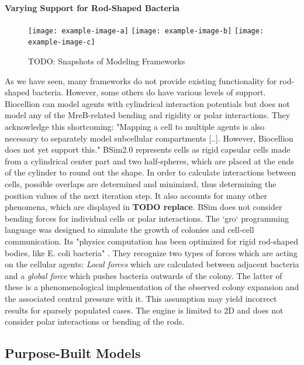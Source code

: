 \documentclass{article}
\begin{document}
\paragraph{Varying Support for Rod-Shaped Bacteria}

\begin{figure}[H]
    \centering
    \texttt{[image: example-image-a]}
    \texttt{[image: example-image-b]}
    \texttt{[image: example-image-c]}
    \caption{TODO: Snapshots of Modeling Frameworks}
\end{figure}

As we have seen, many frameworks do not provide existing functionality for rod-shaped bacteria.
However, some others do have various levels of support.
Biocellion \cite{Kang2014} can model agents with cylindrical interaction potentials but does not
model any of the MreB-related bending and rigidity or polar interactions.
They acknowledge this shortcoming: "Mapping a cell to multiple agents is also necessary to
separately model subcellular compartments [..].
However, Biocellion does not yet support this." \cite{Kang2014}
BSim2.0 represents cells as rigid capsular cells made from a cylindrical center part and two
half-spheres, which are placed at the ends of the cylinder to round out the shape.
In order to calculate interactions between cells, possible overlaps are determined and minimized,
thus determining the position values of the next iteration step.
It also accounts for many other phenomena, which are displayed in \textbf{TODO replace}.
BSim does not consider bending forces for individual cells or polar interactions.
The `gro` programming language was designed to simulate the growth of colonies and cell-cell
communication.
Its "physics computation has been optimized for rigid rod-shaped bodies, like E. coli bacteria"
\cite{Gutirrez2017}.
They recognize two types of forces which are acting on the cellular agents:
\textit{Local forces} which are calculated between adjacent bacteria and a \textit{global force}
which pushes bacteria outwards of the colony.
The latter of these is a phenomenological implementation of the observed colony expansion and the
associated central pressure with it.
This assumption may yield incorrect results for sparsely populated cases.
The engine is limited to 2D and does not consider polar interactions or bending of the rods.

\subsection{Purpose-Built Models}
\end{document}
